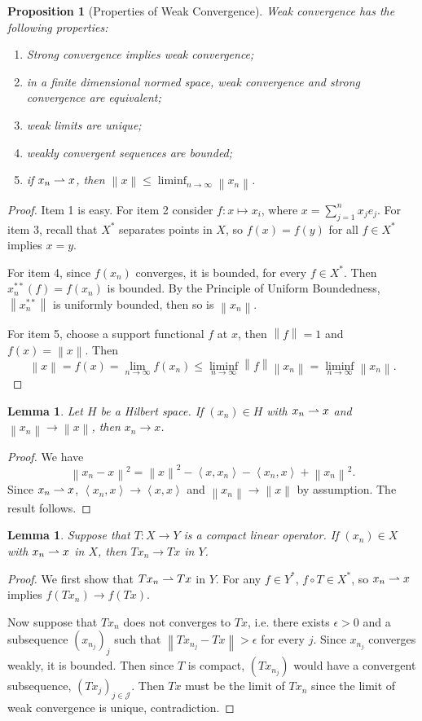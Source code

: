 \documentclass[12pt,a4paper]{report}
\numberwithin{equation}{section}
\theoremstyle{mystyle}
\newtheorem{lemma}[definition]{Lemma}
\newtheorem{proposition}[definition]{Proposition}
\newcommand{\norm}[1]{\left\lVert #1 \right\rVert}
\newcommand{\inner}[1]{\left\langle #1 \right\rangle}
\begin{document}
	\begin{proposition}[Properties of Weak Convergence]
		Weak convergence has the following properties:
		\begin{enumerate}
			\item Strong convergence implies weak convergence;
			\item in a finite dimensional normed space, weak convergence and strong convergence are equivalent;
			\item weak limits are unique;
			\item weakly convergent sequences are bounded;
			\item if $x_n\rightharpoonup x$, then $\norm{x}\leq \liminf_{n\to\infty}\norm{x_n}$.
		\end{enumerate}
	\end{proposition}
	\begin{proof}
		Item 1 is easy. For item 2 consider $f: x\mapsto x_i$, where $x=\sum_{j=1}^n x_je_j$. For item 3, recall that $X^*$ separates points in $X$, so $f(x)=f(y)$ for all $f\in X^*$ implies $x=y$.
		
		For item 4, since $f(x_n)$ converges, it is bounded, for every $f\in X^*$. Then $x_n^{**}(f)=f(x_n)$ is bounded. By the Principle of Uniform Boundedness, $\norm{x_n^{**}}$ is uniformly bounded, then so is $\norm{x_n}$.
		
		For item 5, choose a support functional $f$ at $x$, then $\norm{f}=1$ and $f(x)=\norm{x}$. Then
		$$
		\norm{x}=f(x)=\lim_{n\to \infty}f(x_n)\leq \liminf_{n\to\infty} \norm{f}\norm{x_n}=\liminf_{n\to\infty} \norm{x_n}.
		$$
	\end{proof}
	
	\begin{lemma}
		Let $H$ be a Hilbert space. If $(x_n)\in H$ with $x_n\rightharpoonup x$ and $\norm{x_n}\to \norm{x}$, then $x_n\to x$.
	\end{lemma}
	\begin{proof}
		We have 
		$$
		\norm{x_n-x}^2=\norm{x}^2-\inner{x,x_n}-\inner{x_n,x}+\norm{x_n}^2.
		$$
		Since $x_n\rightharpoonup x$, $\inner{x_n,x}\to \inner{x,x}$ and $\norm{x_n}\to \norm{x}$ by assumption. The result follows.
	\end{proof}

	\begin{lemma}
		Suppose that $T:X\to Y$ is a compact linear operator. If $(x_n)\in X$ with $x_n\rightharpoonup x$ in $X$, then $Tx_n\to Tx$ in $Y$.
	\end{lemma}
	\begin{proof}
		We first show that $Tx_n \rightharpoonup Tx$ in $Y$. For any $f\in Y^*$, $f\circ T\in X^*$, so $x_n\rightharpoonup x$ implies $f(Tx_n)\to f(Tx)$.
		
		Now suppose that $Tx_n$ does not converges to $Tx$, i.e. there exists $\epsilon>0$ and a subsequence $(x_{n_j})_j$ such that $\norm{Tx_{n_j}-Tx}>\epsilon$ for every $j$. Since $x_{n_j}$ converges weakly, it is bounded. Then since $T$ is compact, $(Tx_{n_j})$ would have a convergent subsequence, $(Tx_j)_{j\in \mathscr{J}}$. Then $Tx$ must be the limit of $Tx_n$ since the limit of weak convergence is unique, contradiction.
	\end{proof}
\end{document}

